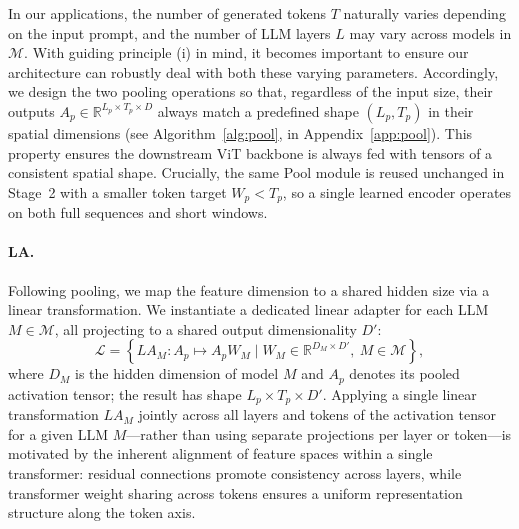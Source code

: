 In our applications, the number of generated tokens $T$ naturally varies
depending on the input prompt, and the number of LLM layers $L$ may vary
across models in $\mathcal{M}$. With guiding principle (i) in mind, it
becomes important to ensure our architecture can robustly deal with
both these varying parameters. Accordingly, we design the two pooling
operations so that, regardless of the input size, their outputs
$A_p \in \mathbb{R}^{L_p \times T_p \times D}$ always match a predefined
shape $(L_p, T_p)$ in their spatial dimensions (see
Algorithm~\ref{alg:pool}, in Appendix~\ref{app:pool}). This property
ensures the downstream ViT backbone is always fed with tensors of a
consistent spatial shape. Crucially, the same Pool module is reused
unchanged in Stage~2 with a smaller token target $W_p < T_p$, so a
single learned encoder operates on both full sequences and short
windows.

\paragraph{LA.} Following pooling, we map the feature dimension to a
shared hidden size via a linear transformation. We instantiate a
dedicated linear adapter for each LLM $M \in \mathcal{M}$, all
projecting to a shared output dimensionality $D'$:
\begin{equation}
\mathcal{L} = \left\{ LA_M : A_p \mapsto A_p W_M \mid W_M \in \mathbb{R}^{D_M \times D'},\ M \in \mathcal{M} \right\},
\end{equation}
where $D_M$ is the hidden dimension of model $M$ and $A_p$ denotes its
pooled activation tensor; the result has shape
$L_p \times T_p \times D'$. Applying a single linear transformation
$LA_M$ jointly across all layers and tokens of the activation tensor
for a given LLM $M$---rather than using separate projections per layer
or token---is motivated by the inherent alignment of feature spaces
within a single transformer: residual connections promote consistency
across layers, while transformer weight sharing across tokens ensures
a uniform representation structure along the token axis.

